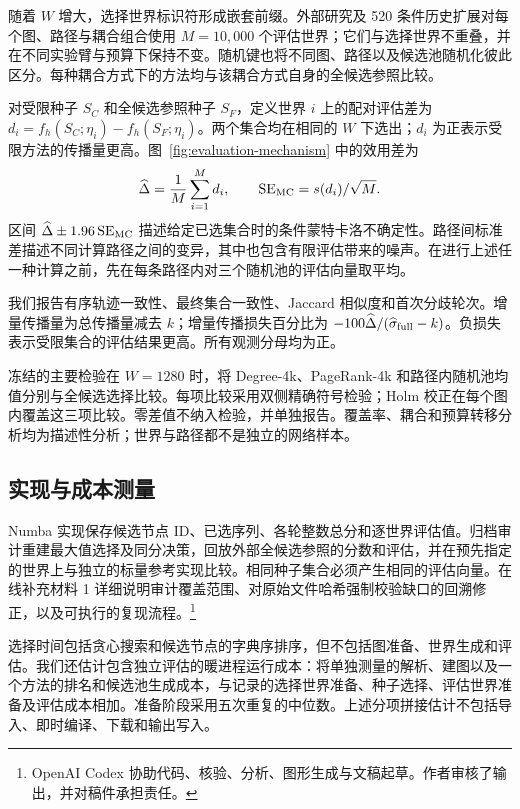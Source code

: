 \documentclass[smallextended]{svjour3}
\begin{document}
随着 $W$ 增大，选择世界标识符形成嵌套前缀。外部研究及 520 条件历史扩展对每个图、路径与耦合组合使用 $M=10,000$ 个评估世界；它们与选择世界不重叠，并在不同实验臂与预算下保持不变。随机键也将不同图、路径以及候选池随机化彼此区分。每种耦合方式下的方法均与该耦合方式自身的全候选参照比较。

对受限种子 $S_C$ 和全候选参照种子 $S_F$，定义世界 $i$ 上的配对评估差为 $d_i=f_h(S_C;\eta_i)-f_h(S_F;\eta_i)$。两个集合均在相同的 $W$ 下选出；$d_i$ 为正表示受限方法的传播量更高。图~\ref{fig:evaluation-mechanism} 中的效用差为
\begin{equation}
\widehat\Delta=\frac{1}{M}\sum_{i=1}^{M}d_i,
\qquad \operatorname{SE}_{\rm MC}=s(d_i)/\sqrt M.
\end{equation}
区间 $\widehat\Delta\pm1.96\operatorname{SE}_{\rm MC}$ 描述给定已选集合时的条件蒙特卡洛不确定性。路径间标准差描述不同计算路径之间的变异，其中也包含有限评估带来的噪声。在进行上述任一种计算之前，先在每条路径内对三个随机池的评估向量取平均。

我们报告有序轨迹一致性、最终集合一致性、Jaccard 相似度和首次分歧轮次。增量传播量为总传播量减去 $k$；增量传播损失百分比为 $-100\widehat\Delta/(\widehat\sigma_{\rm full}-k)$。负损失表示受限集合的评估结果更高。所有观测分母均为正。

冻结的主要检验在 $W=1280$ 时，将 Degree-4k、PageRank-4k 和路径内随机池均值分别与全候选选择比较。每项比较采用双侧精确符号检验；Holm 校正在每个图内覆盖这三项比较。零差值不纳入检验，并单独报告。覆盖率、耦合和预算转移分析均为描述性分析；世界与路径都不是独立的网络样本。

\subsection{实现与成本测量}
Numba 实现保存候选节点 ID、已选序列、各轮整数总分和逐世界评估值。归档审计重建最大值选择及同分决策，回放外部全候选参照的分数和评估，并在预先指定的世界上与独立的标量参考实现比较。相同种子集合必须产生相同的评估向量。在线补充材料 1 详细说明审计覆盖范围、对原始文件哈希强制校验缺口的回溯修正，以及可执行的复现流程。\footnote{OpenAI Codex 协助代码、核验、分析、图形生成与文稿起草。作者审核了输出，并对稿件承担责任。}

选择时间包括贪心搜索和候选节点的字典序排序，但不包括图准备、世界生成和评估。我们还估计包含独立评估的暖进程运行成本：将单独测量的解析、建图以及一个方法的排名和候选池生成成本，与记录的选择世界准备、种子选择、评估世界准备及评估成本相加。准备阶段采用五次重复的中位数。上述分项拼接估计不包括导入、即时编译、下载和输出写入。
\end{document}
